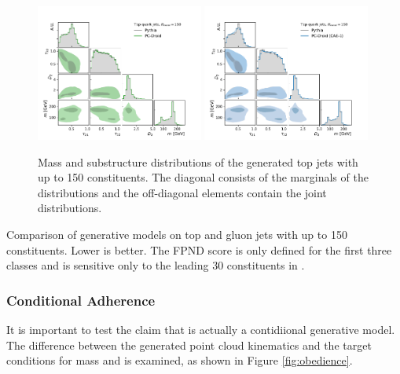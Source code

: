 \begin{figure}[tb]
    \centering
    \includegraphics[width=0.49\textwidth]{Figures/jet_generation/droid/150/hlvs/t/100/hlv_corr_PC-Droid.pdf}
    \includegraphics[width=0.49\textwidth]{Figures/jet_generation/droid/150/hlvs/t/100/hlv_corr_PC-DroidCAE1.pdf}
    \caption{
        Mass and substructure distributions of the generated top jets with up to 150 constituents.
        The diagonal consists of the marginals of the distributions and the off-diagonal elements contain the joint distributions.
    }
    \label{fig:hlvs-150}
\end{figure}

\begin{table}[tb]
    \centering
    \renewcommand{\arraystretch}{1.5}
    \caption{Comparison of generative models on top and gluon jets with up to 150 constituents. Lower is better. The FPND score is only defined for the first three classes and is sensitive only to the leading 30 constituents in \pt.}
    \label{tab:perf-150}
    \resizebox{\textwidth}{!}{%
        
    }
\end{table}

\FloatBarrier

\subsubsection{Conditional Adherence}

It is important to test the claim that \pcdroid is actually a contidiional generative model.
The difference between the generated point cloud kinematics and the target conditions for mass and \pt is examined, as shown in Figure \ref{fig:obedience}.

